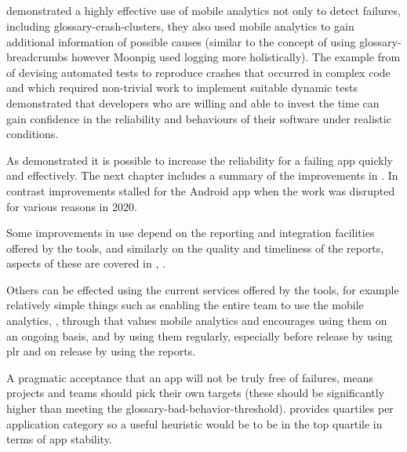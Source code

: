 \subsection{\iuse}
 demonstrated a highly effective use of mobile analytics not only to detect failures, including \glspl{glossary-crash-cluster}, they also used mobile analytics to gain additional information of possible causes (similar to the concept of using \gls{glossary-breadcrumbs} however Moonpig used logging more holistically). The example from  of devising automated tests to reproduce crashes that occurred in complex code and which required non-trivial work to implement suitable dynamic tests demonstrated that developers who are willing and able to invest the time can gain confidence in the reliability and behaviours of their software under realistic conditions.

As  demonstrated it is possible to increase the reliability for a failing app quickly and effectively. The next chapter includes a summary of the improvements in . In contrast improvements stalled for the  Android app when the work was disrupted for various reasons in 2020.

Some improvements in use depend on the reporting and integration facilities offered by the tools, and similarly on the quality and timeliness of the reports, aspects of these are covered in , . 

Others can be effected using the current services offered by the tools, for example relatively simple things such as enabling the entire team to use the mobile analytics, , through  that values mobile analytics and encourages using them on an ongoing basis, and by using them regularly, especially before release by using \acrfull{plr} and on release by using the  reports. 

A pragmatic acceptance that an app will not be truly free of failures, means projects and teams should pick their own targets (these should be significantly higher than meeting the \gls{glossary-bad-behavior-threshold}).  provides quartiles per application category so a useful heuristic would be to be in the top quartile in terms of app stability.

